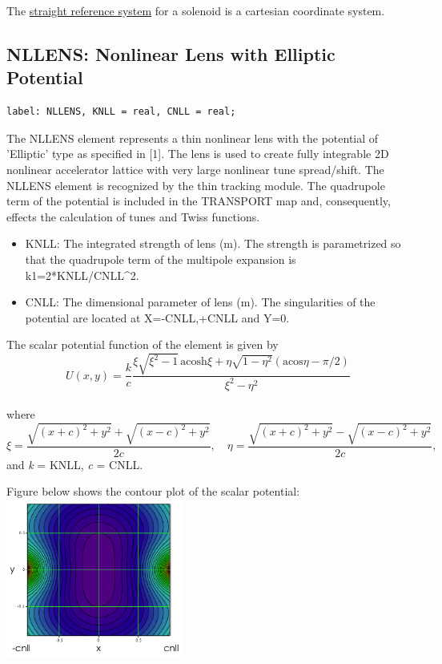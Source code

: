 The \href{local_system.html#straight}{straight reference system} for a
solenoid is a cartesian coordinate system. 
 


%
\subsection{NLLENS: Nonlinear Lens with Elliptic Potential}

\begin{verbatim}
label: NLLENS, KNLL = real, CNLL = real;
\end{verbatim}

The NLLENS element represents a thin nonlinear lens with the potential
of 'Elliptic' type as specified in [1]. The lens is used to create fully
integrable 2D nonlinear accelerator lattice with very large nonlinear
tune spread/shift. The NLLENS element is recognized by the thin tracking
module. The quadrupole term of the potential is included in the
TRANSPORT map and, consequently, effects the calculation of tunes and
Twiss functions.   

\begin{itemize}
   \item KNLL: The integrated strength of lens (m). The strength is
     parametrized so that     the quadrupole term of the multipole
     expansion is k1=2*KNLL/CNLL\textasciicircum2.      
   \item CNLL: The dimensional parameter of lens (m). The singularities
     of the potential are     located at X=-CNLL,+CNLL and Y=0.  
\end{itemize}

The scalar potential function of the element is given by
\\
\[
U(x,y)=\frac{k}{c}\frac{\xi\sqrt{\xi^2-1} \, \text{acosh}\xi +  
  \eta\sqrt{1-\eta^2}(\text{acos}\eta-\pi/2)}{\xi^2-\eta^2}
\]
\\ where 
\[
\xi = \frac{\sqrt{(x+c)^2+y^2}+\sqrt{(x-c)^2+y^2}}{2c}, 
\quad \eta = \frac{\sqrt{(x+c)^2+y^2}-\sqrt{(x-c)^2+y^2}}{2c},
\]
and \textit{k} = KNLL, \textit{c} = CNLL.

Figure below shows the contour plot of the scalar potential: \\
\includegraphics[width=220px]{Introduction/nllens_potential-2D.png}

